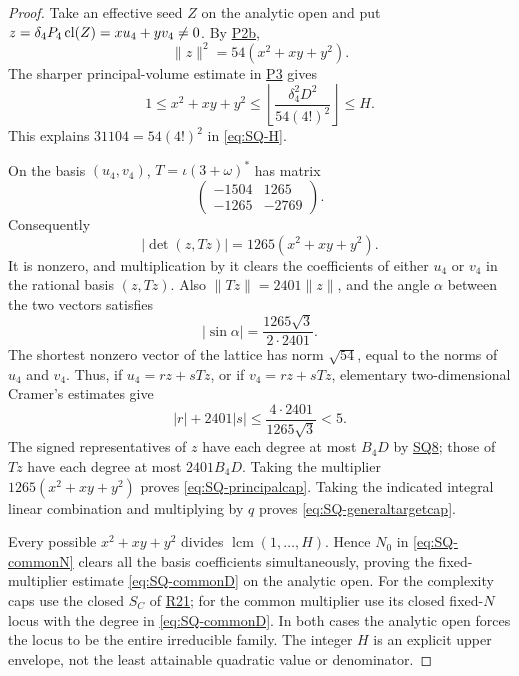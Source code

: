 \documentclass[11pt,a4paper]{article}
\theoremstyle{definition}\newtheorem{definition}[theorem]{Definition}
\theoremstyle{remark}\newtheorem{remark}[theorem]{Remark}
\newcommand{\findingref}[1]{\hyperref[#1]{\textsf{#1}}}
\begin{document}
\begin{proof}
Take an effective seed $Z$ on the analytic open and put $z=\delta_4P_4\operatorname{cl}(Z)=xu_4+yv_4\ne0$. By \findingref{P2b},
\[
 \|z\|^2=54(x^2+xy+y^2).
\]
The sharper principal-volume estimate in \findingref{P3} gives
\[
 1\le x^2+xy+y^2\le
       \left\lfloor\frac{\delta_4^2D^2}{54(4!)^2}\right\rfloor\le H.
\]
This explains $31104=54(4!)^2$ in \eqref{eq:SQ-H}.

On the basis $(u_4,v_4)$, $T=\iota(3+\omega)^*$ has matrix
\[
 \begin{pmatrix}-1504&1265\\-1265&-2769\end{pmatrix}.
\]
Consequently
\[
 |\det(z,Tz)|=1265(x^2+xy+y^2).
\]
It is nonzero, and multiplication by it clears the coefficients of either $u_4$ or $v_4$ in the rational basis $(z,Tz)$. Also $\|Tz\|=2401\|z\|$, and the angle $\alpha$ between the two vectors satisfies
\[
 |\sin\alpha|=\frac{1265\sqrt3}{2\cdot2401}.
\]
The shortest nonzero vector of the lattice has norm $\sqrt{54}$, equal to the norms of $u_4$ and $v_4$. Thus, if $u_4=rz+sTz$, or if $v_4=rz+sTz$, elementary two-dimensional Cramer's estimates give
\[
 |r|+2401|s|
 \le\frac{4\cdot2401}{1265\sqrt3}<5.
\]
The signed representatives of $z$ have each degree at most $B_4D$ by \findingref{SQ8}; those of $Tz$ have each degree at most $2401B_4D$. Taking the multiplier $1265(x^2+xy+y^2)$ proves \eqref{eq:SQ-principalcap}. Taking the indicated integral linear combination and multiplying by $q$ proves \eqref{eq:SQ-generaltargetcap}.

Every possible $x^2+xy+y^2$ divides $\operatorname{lcm}(1,\ldots,H)$. Hence $N_0$ in \eqref{eq:SQ-commonN} clears all the basis coefficients simultaneously, proving the fixed-multiplier estimate \eqref{eq:SQ-commonD} on the analytic open. For the complexity caps use the closed $S_C$ of \findingref{R21}; for the common multiplier use its closed fixed-$N$ locus with the degree in \eqref{eq:SQ-commonD}. In both cases the analytic open forces the locus to be the entire irreducible family. The integer $H$ is an explicit upper envelope, not the least attainable quadratic value or denominator.
\end{proof}
\end{document}

